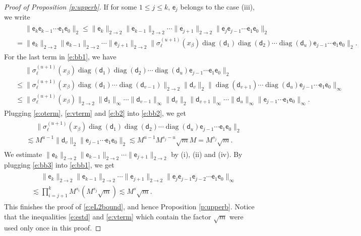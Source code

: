\documentclass{article}
\numberwithin{equation}{section}
\newcommand{\sfe}{{\mathsf e}}
\newcommand{\sfd}{{\mathsf d}}
\DeclareMathOperator{\diag}{diag}
\renewcommand{\leq}{\leqslant}
\newcommand{\1}{\mathds{1}}
\theoremstyle{plain} %
\begin{document}
\begin{proof}[Proof of Proposition \ref{p:upperb}]
If for some $1\leq j\leq k$, $\sfe_j$ belongs to the case (iii), we write
\begin{align}\begin{split}\label{e:bb1}
&\phantom{{}={}}\|\sfe_k\sfe_{k-1}\cdots\sfe_1\sfe_0\|_2
\leq  \|\sfe_k\|_{2\rightarrow 2}\|\sfe_{k-1}\|_{2\rightarrow 2}\cdots\|\sfe_{j+1}\|_{2\rightarrow 2}
\|\sfe_j\sfe_{j-1}\cdots \sfe_1\sfe_0\|_{2}\\
&= \|\sfe_k\|_{2\rightarrow 2}\|\sfe_{k-1}\|_{2\rightarrow 2}\cdots\|\sfe_{j+1}\|_{2\rightarrow 2}
\|\sigma_\ell^{(u+1)}(x_\beta)\diag(\sfd_1)\diag(\sfd_2)\cdots \diag(\sfd_u)\sfe_{j-1}\cdots \sfe_1\sfe_0\|_{2}.
\end{split}\end{align}
For the last term in \eqref{e:bb1}, we have
\begin{align}\begin{split}\label{e:bb2}
&\phantom{{}={}}\|\sigma_\ell^{(u+1)}(x_\beta)\diag(\sfd_1)\diag(\sfd_2)\cdots \diag(\sfd_u)\sfe_{j-1}\cdots \sfe_1\sfe_0\|_{2}\\
&\leq
\|\sigma_\ell^{(u+1)}(x_\beta)\diag(\sfd_1)\cdots \diag(\sfd_{v-1})\|_{2\rightarrow 2}\|\sfd_v\|_2\|\diag(\sfd_{v+1})\cdots \diag(\sfd_{u})\sfe_{j-1}\cdots \sfe_1\sfe_0\|_{\infty}\\
&\leq
\|\sigma_\ell^{(u+1)}(x_\beta)\|_{2\rightarrow 2}\|\sfd_1\|_\infty\cdots \|\sfd_{v-1}\|_\infty\|\sfd_v\|_2\|\sfd_{v+1}\|_\infty\cdots \|\sfd_{u}\|_{\infty}\|\sfe_{j-1}\cdots \sfe_1\sfe_0\|_{\infty}.
\end{split}\end{align}
Plugging \eqref{e:oterm}, \eqref{e:vterm} and \eqref{e:b2} into \eqref{e:bb2}, we get
\begin{align}\begin{split}\label{e:bb3}
&\phantom{{}={}}\|\sigma_\ell^{(u+1)}(x_\beta)\diag(\sfd_1)\diag(\sfd_2)\cdots \diag(\sfd_u)\sfe_{j-1}\cdots \sfe_1\sfe_0\|_{2}\\
&\lesssim M^{u-1} \|\sfd_v\|_2\| \sfe_{j-1}\cdots \sfe_1\sfe_0\|_{2}
\lesssim M^{u-1} M^{s_j-u}\sqrt m M= M^{s_j}\sqrt m.
\end{split}\end{align}
We estimate $\|\sfe_k\|_{2\rightarrow 2} \|\sfe_{k-1}\|_{2\rightarrow 2}\cdots\|\sfe_{j+1}\|_{2\rightarrow 2}$ by (i), (ii) and (iv).
By plugging \eqref{e:bb3} into \eqref{e:bb1}, we get
\begin{align*}\begin{split}
&\phantom{{}={}}\|\sfe_k\|_{2\rightarrow 2}\|\sfe_{k-1}\|_{2\rightarrow 2}\cdots\|\sfe_{j+1}\|_{2\rightarrow 2}
\|\sfe_j\sfe_{j-1}\sfe_{j-2}\cdots \sfe_1\sfe_0\|_{\infty}\\
&\lesssim \prod_{i=j+1}^k M^{s_i} (M^{s_j}\sqrt m) 
\lesssim M^{s}\sqrt m.
\end{split}\end{align*}
This finishes the proof of \eqref{e:eL2bound}, and hence Proposition \ref{p:upperb}. 
Notice that the inequalities \eqref{e:estd} and \eqref{e:vterm} which contain the factor $\sqrt m$ were used only once in this proof.
\end{proof}
\end{document}
